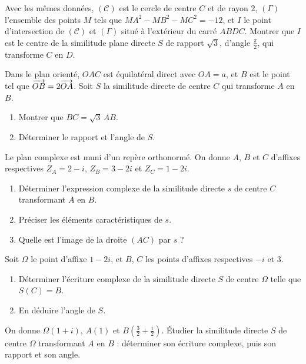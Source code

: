 \begin{annales}
Avec les mêmes données, $(\mathcal C)$ est le cercle de centre $C$ et de rayon
$2$, $(\Gamma)$ l'ensemble des points $M$ tels que
$MA^{2}-MB^{2}-MC^{2} = -12$, et $I$ le point d'intersection de
$(\mathcal C)$ et $(\Gamma)$ situé à l'extérieur du carré $ABDC$. Montrer que
$I$ est le centre de la similitude plane directe $S$ de rapport $\sqrt3$,
d'angle $\frac{\pi}{2}$, qui transforme $C$ en $D$.

Dans le plan orienté, $OAC$ est équilatéral direct avec $OA = a$, et $B$ est
le point tel que $\overrightarrow{OB} = 2\overrightarrow{OA}$. Soit $S$ la similitude directe de
centre $C$ qui transforme $A$ en $B$.
\begin{enumerate}[label=\textbf{\alph*)}, leftmargin=*, itemsep=0.15em]
  \item Montrer que $BC = \sqrt3\,AB$.
  \item Déterminer le rapport et l'angle de $S$.
\end{enumerate}

Le plan complexe est muni d'un repère orthonormé. On donne $A$, $B$ et $C$
d'affixes respectives $Z_{A} = 2-i$, $Z_{B} = 3-2i$ et $Z_{C} = 1-2i$.
\begin{enumerate}[label=\textbf{\alph*)}, leftmargin=*, itemsep=0.15em]
  \item Déterminer l'expression complexe de la similitude directe $s$ de
        centre $C$ transformant $A$ en $B$.
  \item Préciser les éléments caractéristiques de $s$.
  \item Quelle est l'image de la droite $(AC)$ par $s$ ?
\end{enumerate}

Soit $\Omega$ le point d'affixe $1-2i$, et $B$, $C$ les points d'affixes
respectives $-i$ et $3$.
\begin{enumerate}[label=\textbf{\alph*)}, leftmargin=*, itemsep=0.15em]
  \item Déterminer l'écriture complexe de la similitude directe $S$ de centre
        $\Omega$ telle que $S(C) = B$.
  \item En déduire l'angle de $S$.
\end{enumerate}

On donne $\Omega(1+i)$, $A(1)$ et $B\!\left(\frac32+\frac i2\right)$. Étudier
la similitude directe $S$ de centre $\Omega$ transformant $A$ en $B$ :
déterminer son écriture complexe, puis son rapport et son angle.
\end{annales}

